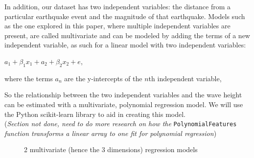 \documentclass[11pt,letterpaper]{article}
\begin{document}
In addition, our dataset has two independent variables: the distance from a particular earthquake event and the magnitude of that earthquake. Models such as the one explored in this paper, where multiple independent variables are present, are called multivariate and can be modeled by adding the terms of a new independent variable, as such for a linear model with two independent variables:

$a_1 + \beta_1 x_1 + a_2 + \beta_2 x_2 + e$,

where the terms $a_n$ are the y-intercepts of the $n$th independent variable,

So the relationship between the two independent variables and the wave height can be estimated with a multivariate, polynomial regression model. We will use the Python scikit-learn library to aid in creating this model. \\

(\textit{Section not done, need to do more research on how the} \verb|PolynomialFeatures| \textit{function transforms a linear array to one fit for polynomial regression})


\begin{figure}[H]
    \centering
    \qquad
    \caption{2 multivariate (hence the 3 dimensions) regression models}
    \label{fig:example}
\end{figure}
\end{document}
